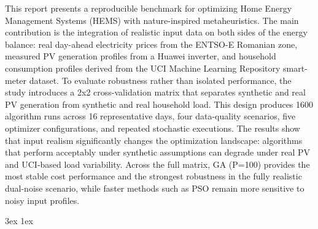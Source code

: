 \documentclass[12pt]{ubb_dolgozat}
\begin{document}
\maketitle

\begin{abstractEN}
This report presents a reproducible benchmark for optimizing Home Energy Management Systems (HEMS) with nature-inspired metaheuristics. The main contribution is the integration of realistic input data on both sides of the energy balance: real day-ahead electricity prices from the ENTSO-E Romanian zone, measured PV generation profiles from a Huawei inverter, and household consumption profiles derived from the UCI Machine Learning Repository smart-meter dataset. To evaluate robustness rather than isolated performance, the study introduces a 2x2 cross-validation matrix that separates synthetic and real PV generation from synthetic and real household load. This design produces 1600 algorithm runs across 16 representative days, four data-quality scenarios, five optimizer configurations, and repeated stochastic executions. The results show that input realism significantly changes the optimization landscape: algorithms that perform acceptably under synthetic assumptions can degrade under real PV and UCI-based load variability. Across the full matrix, GA (P=100) provides the most stable cost performance and the strongest robustness in the fully realistic dual-noise scenario, while faster methods such as PSO remain more sensitive to noisy input profiles.
\end{abstractEN}

{ \baselineskip 3ex
  \parskip 1ex
  \tableofcontents
}

\setcounter{page}{1}








\appendix




\end{document}
